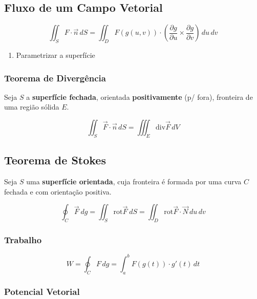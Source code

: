 \documentclass[11pt, a4paper]{article}
\begin{document}
\subsection{Fluxo de um Campo Vetorial}

\begin{equation*}
    \iint_S F \cdot \vec{n} \, dS =
    \iint_D F(g(u, v)) \cdot
    \left(
    \frac{\partial g}{\partial u} \times \frac{\partial g}{\partial v}
    \right) \, du\,dv
\end{equation*}

\begin{enumerate}
    \item Parametrizar a superfície
\end{enumerate}

\subsubsection{Teorema de Divergência}

Seja $S$ a \textbf{superfície fechada}, orientada \textbf{positivamente} (p/
fora), fronteira de uma região sólida $E$.

\begin{equation*}
    \iint_S \vec{F} \cdot \vec{n} \, dS =
    \iiint_E \text{div} \vec{F} \, dV
\end{equation*}

\subsection{Teorema de Stokes}

Seja $S$ uma \textbf{superfície orientada}, cuja fronteira é formada por uma
curva $C$ fechada e com orientação positiva.

\begin{equation*}
    \oint_C \vec{F} \ dg =
    \iint_S \text{rot} \vec{F} \ dS =
    \iint_D \text{rot} \vec{F} \cdot \vec{N} \, du\,dv
\end{equation*}

\subsubsection{Trabalho}
\begin{equation*}
    W = \oint_C F \, dg =
    \int_{a}^{b} F\left(g(t)\right) \cdot g'(t) \, dt
\end{equation*}

\subsubsection{Potencial Vetorial}
\end{document}
